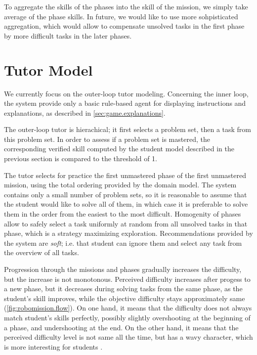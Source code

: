 To aggregate the skills of the phases into the skill of the mission,
we simply take average of the phase skills.
In future, we would like to use more sohpisticated aggregation,
which would allow to compensate unsolved tasks in the first phase
by more difficult tasks in the later phases.

\section{Tutor Model}

We currently focus on the outer-loop tutor modeling.
Concerning the inner loop, the system provide only a basic
rule-based agent for displaying instructions and explanations,
as described in \cref{sec:game.explanations}.

The outer-loop tutor is hierachical;
it first selects a problem set, then a task from this problem set.
In order to assess if a problem set is mastered,
the corresponding verified skill
computed by the student model described in the previous section
is compared to the threshold of 1. %

The tutor selects for practice the first unmastered phase of the first
unmastered mission, using the total ordering provided by the domain model.
The system contains only a small number of problem sets,
so it is reasonable to assume that the student would like to solve all of
them,
in which case it is preferable to solve them in the order from the
easiest to the most difficult.
Homogenity of phases allow to safely select a task uniformly at random from
all unsolved tasks in that phase, which is a strategy maximizing exploration.
Recommendations provided by the system are \emph{soft};
i.e. that student can ignore them and select any task
from the overview of all tasks.

Progression through the missions and phases gradually increases the difficulty,
but the increase is not monotonous.
Perceived difficulty increases after progess to a new phase,
but it decreases during solving tasks from the same phase,
as the student's skill improves, while the objective difficulty stays
approximately same (\cref{fig:robomission.flow}).
On one hand, it means that the difficulty does not always match student's
skills perfectly, possibly slightly overshooting at the beginning of a phase,
and undershooting at the end.
On the other hand, it means that the perceived difficulty level is not
same all the time, but has a wavy character, which is more interesting
for students %
\cite{book-of-lenses}.

